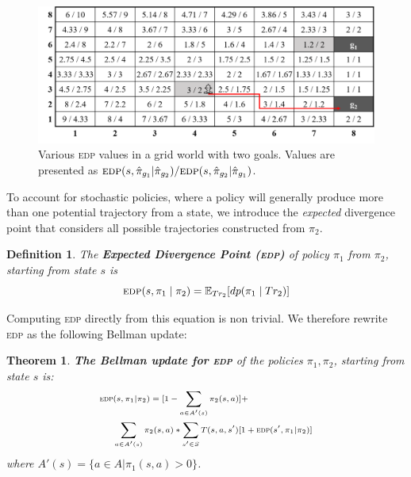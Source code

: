 \documentclass[letterpaper]{article}
\newtheorem{theorem}{Theorem}
\newtheorem{definition}{Definition}
\begin{document}
\begin{figure}
\centering
\includegraphics[width=\linewidth]{Figures/EDP_values3.png}
\caption{Various \textsc{edp} values in a grid world with two goals. Values are presented as $\textsc{edp}(s,\hat{\pi}_{g_1} | \hat{\pi}_{g_2})/\textsc{edp}(s, \hat{\pi}_{g_2} | \hat{\pi}_{g_1})$.}%
\label{fig:edp}
\end{figure}

To account for stochastic policies, where a policy will generally produce more than one potential trajectory from a state, we introduce the \emph{expected} divergence point that considers all possible trajectories constructed from $\pi_2$.
\begin{definition}
The \textbf{Expected Divergence Point (\textsc{edp})} of policy $\pi_1$ from $\pi_2$, starting from state $s$ is
\begin{equation*}
\textsc{edp}(s, \pi_1 \mid \pi_2) = \mathbb{E}_{Tr_2}[dp(\pi_{1} \mid Tr_2)]
\end{equation*}
\end{definition}




\noindent Computing \textsc{edp} directly from this equation is non trivial. We therefore rewrite \textsc{edp} as the following Bellman update:
\begin{theorem}
\label{thm:bellman}
\textbf{The Bellman update for \textsc{edp}} of the policies $\pi_1, \pi_2$, starting from state $s$ is:
\begin{equation}
\scriptsize
\begin{split}
\textsc{edp} & (s, \pi_1 |  \pi_2) = [1 - \sum\limits_{a\in A'(s)}\pi_2(s, a)] + \\ &
\sum\limits_{a\in A'(s)}\pi_2(s,a) * \sum\limits_{s'\in S}T(s, a, s')[1 + \textsc{edp}(s', \pi_1 |  \pi_2)]
\end{split}
\normalsize
\label{eq:bellman}
\end{equation}
where $A'(s)=\{a\in A | \pi_1(s, a) > 0\}$.
\end{theorem}
\end{document}
